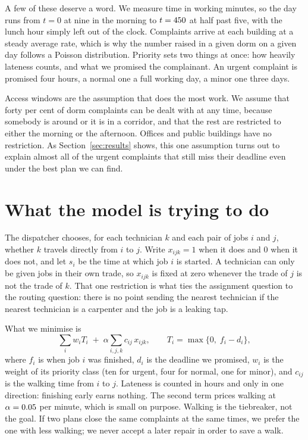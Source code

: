 \documentclass[11pt]{article}
\begin{document}
A few of these deserve a word. We measure time in working minutes, so the day
runs from $t=0$ at nine in the morning to $t=450$ at half past
five, with the lunch hour simply left out of the clock. Complaints arrive at
each building at a steady average rate, which is why the number raised in a
given dorm on a given day follows a Poisson distribution. Priority sets two
things at once: how heavily lateness counts, and what we promised the
complainant. An urgent complaint is promised four hours, a normal one a full
working day, a minor one three days.

Access windows are the assumption that does the most work. We assume that
forty per cent of dorm complaints can be dealt with at any time, because
somebody is around or it is in a corridor, and that the rest are restricted to
either the morning or the afternoon. Offices and public buildings have no
restriction. As Section~\ref{sec:results} shows, this one assumption turns out
to explain almost all of the urgent complaints that still miss their deadline
even under the best plan we can find.

\section{What the model is trying to do}

The dispatcher chooses, for each technician $k$ and each pair of jobs $i$ and
$j$, whether $k$ travels directly from $i$ to $j$. Write $x_{ijk}=1$ when it
does and $0$ when it does not, and let $s_i$ be the time at which job $i$ is
started. A technician can only be given jobs in their own trade, so $x_{ijk}$
is fixed at zero whenever the trade of $j$ is not the trade of $k$. That one
restriction is what ties the assignment question to the routing question:
there is no point sending the nearest technician if the nearest technician is
a carpenter and the job is a leaking tap.

What we minimise is
\[
\sum_{i} w_i T_i \;+\; \alpha \sum_{i,j,k} c_{ij}\, x_{ijk},
\qquad
T_i = \max\{0,\; f_i - d_i\},
\]
where $f_i$ is when job $i$ was finished, $d_i$ is the deadline we promised,
$w_i$ is the weight of its priority class (ten for urgent, four for normal,
one for minor), and $c_{ij}$ is the walking time from $i$ to $j$. Lateness is
counted in hours and only in one direction: finishing early earns nothing.
The second term prices walking at $\alpha=0.05$ per minute, which is small
on purpose. Walking is the tiebreaker, not the goal. If two plans close the
same complaints at the same times, we prefer the one with less walking; we
never accept a later repair in order to save a walk.
\end{document}
